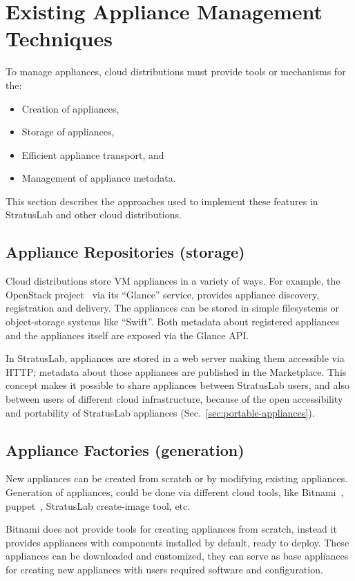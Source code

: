 \section{Existing Appliance Management Techniques}
\label{sec:other-approaches}

To manage appliances, cloud distributions must provide tools or
mechanisms for the:
\begin{itemize}
\item Creation of appliances,
\item Storage of appliances,
\item Efficient appliance transport, and
\item Management of appliance metadata.
\end{itemize}
This section describes the approaches used to implement these features
in StratusLab and other cloud distributions.

\subsection{Appliance Repositories (storage)}

Cloud distributions store VM appliances in a variety of ways. 
For example, the OpenStack project~\cite{openstack} 
via its ``Glance'' service, provides appliance discovery, registration and delivery.
The appliances can be stored in simple filesystems or 
object-storage systems like ``Swift''\@. Both metadata about registered appliances 
and the appliances itself are exposed via the Glance API\@.

In StratusLab, appliances are stored in a web server making them accessible via HTTP;
metadata about those appliances are published in the Marketplace\@. This concept makes it possible 
to share appliances between StratusLab users, and also between users of different cloud 
infrastructure, because of the open accessibility and portability of StratusLab appliances (Sec.~\ref{sec:portable-appliances}). 

\subsection{Appliance Factories (generation)}
New appliances can be created from scratch or by modifying existing appliances.
Generation of appliances, could be done via different
cloud tools, like Bitnami~\cite{bitnami}, puppet~\cite{puppet}, StratusLab create-image tool,
etc.

Bitnami does not provide tools for creating appliances from scratch,
instead it provides appliances with components installed by default, ready to deploy.
These appliances can be downloaded and customized, they can serve as 
base appliances for creating new appliances with users required software 
and configuration. 

